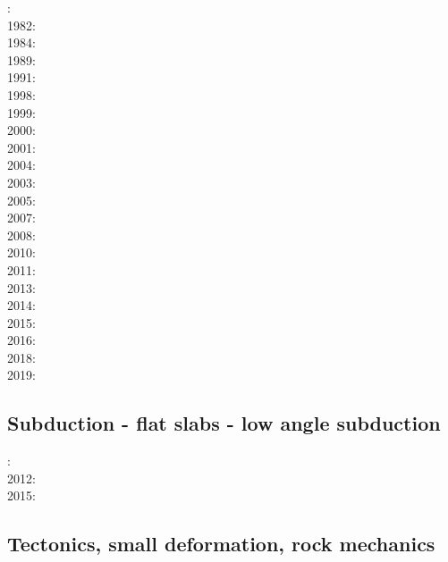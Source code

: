 : \cite{bird78}\\
1982: \cite{clwv82}\\
1984: \cite{cade84}\\
1989: \cite{clwv89}\\
1991: \cite{muph91}\\
1998: \cite{togu98}\\
1999: \cite{fagd99}\\
2000: \cite{pybf00}\\
2001: \cite{dohe01}\cite{reyb01}\cite{brry01}\\
2004: \cite{ster04}\cite{guhl04}\\
2003: \cite{hags03}\\
2005: \cite{bihi05}\\
2007: \cite{kore07}\\
2008: \cite{uegs08}\\
2010: \cite{nigm10}\cite{bucl10}\\
2011: \cite{bagw11}\cite{nigm11}\\
2013: \cite{dyge13}\cite{mana13}\cite{kore13}\\
2014: \cite{recf14}\cite{macg14}\\
2015: \cite{matv15}\cite{pebu15}\cite{vapm15}\\
2016: \cite{crta16}\\
2018: \cite{zhlg18}\cite{basq18}\\
2019: \cite{begb19}\cite{gubg19}

\subsection*{Subduction - flat slabs - low angle subduction}

: \cite{cube11}\\
2012: \cite{mapm12}\\
2015: \cite{gehm15}

\subsection*{Tectonics, small deformation, rock mechanics}

\noindent
\cite{ilma93}
\cite{hept96}
\cite{esfm08}
\cite{lega12}

